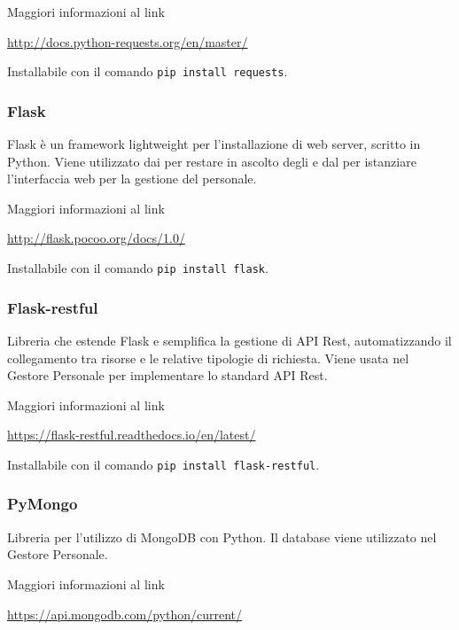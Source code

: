 Maggiori informazioni al link

\begin{center}
    \url{http://docs.python-requests.org/en/master/}
\end{center}

Installabile con il comando \texttt{pip install requests}.

\subsubsection{Flask}
Flask è un framework lightweight per l'installazione di web server, scritto in Python.
Viene utilizzato dai  per restare in ascolto degli  e dal  per istanziare l'interfaccia
web per la gestione del personale.

Maggiori informazioni al link

\begin{center}
    \url{http://flask.pocoo.org/docs/1.0/}
\end{center}

Installabile con il comando \texttt{pip install flask}.

\subsubsection{Flask-restful}
Libreria che estende Flask e semplifica la gestione di API Rest, automatizzando il collegamento tra risorse e le relative tipologie di richiesta.
Viene usata nel Gestore Personale per implementare lo standard API Rest.

Maggiori informazioni al link

\begin{center}
    \url{https://flask-restful.readthedocs.io/en/latest/}
\end{center}

Installabile con il comando \texttt{pip install flask-restful}.

\subsubsection{PyMongo}

Libreria per l'utilizzo di MongoDB con Python. Il database viene utilizzato nel Gestore Personale.

Maggiori informazioni al link

\begin{center}
    \url{https://api.mongodb.com/python/current/}
\end{center}

